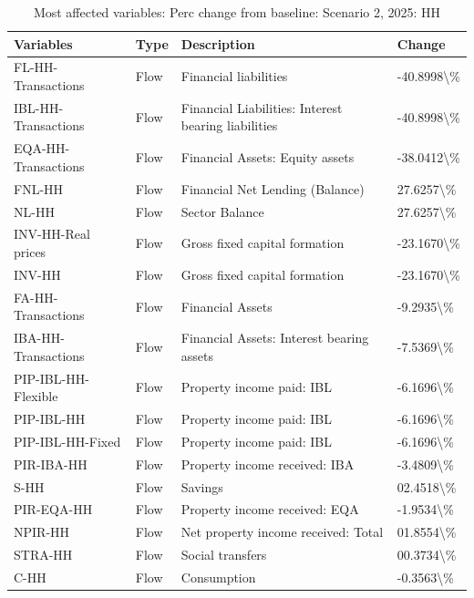 \documentclass[
]{book}
\begin{document}
\begin{table}

\caption{\label{tab:most-affected-scenario-2-perc-2025-HH}Most affected variables: Perc change from baseline: Scenario 2, 2025: HH}
\centering
\fontsize{10}{12}\selectfont
\begin{tabular}[t]{l|l|l|l}
\hline
Variables & Type & Description & Change\\
\hline
FL-HH-Transactions & Flow & Financial liabilities & -40.8998\textbackslash{}\%\\
\hline
IBL-HH-Transactions & Flow & Financial Liabilities: Interest bearing liabilities & -40.8998\textbackslash{}\%\\
\hline
EQA-HH-Transactions & Flow & Financial Assets: Equity assets & -38.0412\textbackslash{}\%\\
\hline
FNL-HH & Flow & Financial Net Lending (Balance) & 27.6257\textbackslash{}\%\\
\hline
NL-HH & Flow & Sector Balance & 27.6257\textbackslash{}\%\\
\hline
INV-HH-Real prices & Flow & Gross fixed capital formation & -23.1670\textbackslash{}\%\\
\hline
INV-HH & Flow & Gross fixed capital formation & -23.1670\textbackslash{}\%\\
\hline
FA-HH-Transactions & Flow & Financial Assets & -9.2935\textbackslash{}\%\\
\hline
IBA-HH-Transactions & Flow & Financial Assets: Interest bearing assets & -7.5369\textbackslash{}\%\\
\hline
PIP-IBL-HH-Flexible & Flow & Property income paid: IBL & -6.1696\textbackslash{}\%\\
\hline
PIP-IBL-HH & Flow & Property income paid: IBL & -6.1696\textbackslash{}\%\\
\hline
PIP-IBL-HH-Fixed & Flow & Property income paid: IBL & -6.1696\textbackslash{}\%\\
\hline
PIR-IBA-HH & Flow & Property income received: IBA & -3.4809\textbackslash{}\%\\
\hline
S-HH & Flow & Savings & 02.4518\textbackslash{}\%\\
\hline
PIR-EQA-HH & Flow & Property income received: EQA & -1.9534\textbackslash{}\%\\
\hline
NPIR-HH & Flow & Net property income received: Total & 01.8554\textbackslash{}\%\\
\hline
STRA-HH & Flow & Social transfers & 00.3734\textbackslash{}\%\\
\hline
C-HH & Flow & Consumption & -0.3563\textbackslash{}\%\\

\end{tabular}
\end{table}
\end{document}
